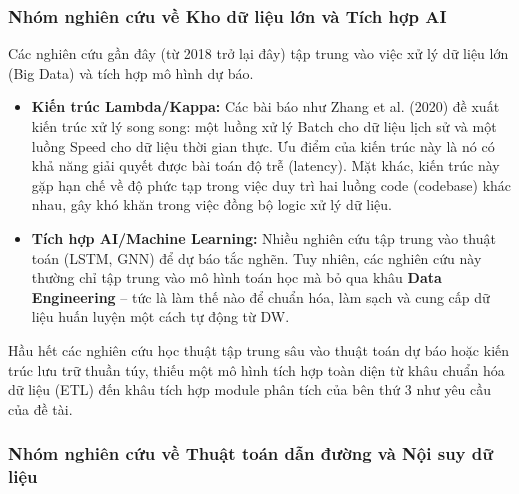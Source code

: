 \subsubsection{Nhóm nghiên cứu về Kho dữ liệu lớn và Tích hợp AI}

Các nghiên cứu gần đây (từ 2018 trở lại đây) tập trung vào việc xử lý dữ liệu lớn (Big Data) và tích hợp mô hình dự báo.

\begin{itemize}
    \item \textbf{Kiến trúc Lambda/Kappa:} Các bài báo như Zhang et al. (2020) đề xuất kiến trúc xử lý song song: một luồng xử lý Batch cho dữ liệu lịch sử và một luồng Speed cho dữ liệu thời gian thực. Ưu điểm của kiến trúc này là nó có khả năng giải quyết được bài toán độ trễ (latency). Mặt khác, kiến trúc này gặp hạn chế về độ phức tạp trong việc duy trì hai luồng code (codebase) khác nhau, gây khó khăn trong việc đồng bộ logic xử lý dữ liệu.
    
    \item \textbf{Tích hợp AI/Machine Learning:} Nhiều nghiên cứu tập trung vào thuật toán (LSTM, GNN) để dự báo tắc nghẽn. Tuy nhiên, các nghiên cứu này thường chỉ tập trung vào mô hình toán học mà bỏ qua khâu \textbf{Data Engineering} – tức là làm thế nào để chuẩn hóa, làm sạch và cung cấp dữ liệu huấn luyện một cách tự động từ DW.
\end{itemize}

Hầu hết các nghiên cứu học thuật tập trung sâu vào thuật toán dự báo hoặc kiến trúc lưu trữ thuần túy, thiếu một mô hình tích hợp toàn diện từ khâu chuẩn hóa dữ liệu (ETL) đến khâu tích hợp module phân tích của bên thứ 3 như yêu cầu của đề tài.

\subsubsection{Nhóm nghiên cứu về Thuật toán dẫn đường và Nội suy dữ liệu}

